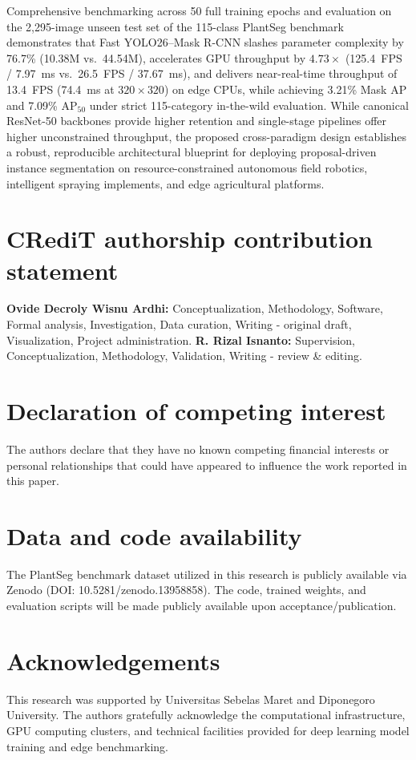 \documentclass[5p,times]{elsarticle}
\begin{document}
Comprehensive benchmarking across 50 full training epochs and evaluation on the 2,295-image unseen test set of the 115-class PlantSeg benchmark demonstrates that Fast YOLO26--Mask R-CNN slashes parameter complexity by 76.7\% (10.38M vs.\ 44.54M), accelerates GPU throughput by $4.73\times$ (125.4~FPS / 7.97~ms vs.\ 26.5~FPS / 37.67~ms), and delivers near-real-time throughput of 13.4~FPS (74.4~ms at $320 \times 320$) on edge CPUs, while achieving 3.21\% Mask AP and 7.09\% $\mathrm{AP}_{50}$ under strict 115-category in-the-wild evaluation. While canonical ResNet-50 backbones provide higher retention and single-stage pipelines offer higher unconstrained throughput, the proposed cross-paradigm design establishes a robust, reproducible architectural blueprint for deploying proposal-driven instance segmentation on resource-constrained autonomous field robotics, intelligent spraying implements, and edge agricultural platforms.

\section*{CRediT authorship contribution statement}
\textbf{Ovide Decroly Wisnu Ardhi:} Conceptualization, Methodology, Software, Formal analysis, Investigation, Data curation, Writing - original draft, Visualization, Project administration.
\textbf{R. Rizal Isnanto:} Supervision, Conceptualization, Methodology, Validation, Writing - review \& editing.

\section*{Declaration of competing interest}
The authors declare that they have no known competing financial interests or personal relationships that could have appeared to influence the work reported in this paper.

\section*{Data and code availability}
The PlantSeg benchmark dataset utilized in this research is publicly available via Zenodo (DOI: 10.5281/zenodo.13958858). The code, trained weights, and evaluation scripts will be made publicly available upon acceptance/publication.

\section*{Acknowledgements}
This research was supported by Universitas Sebelas Maret and Diponegoro University. The authors gratefully acknowledge the computational infrastructure, GPU computing clusters, and technical facilities provided for deep learning model training and edge benchmarking.
\end{document}
